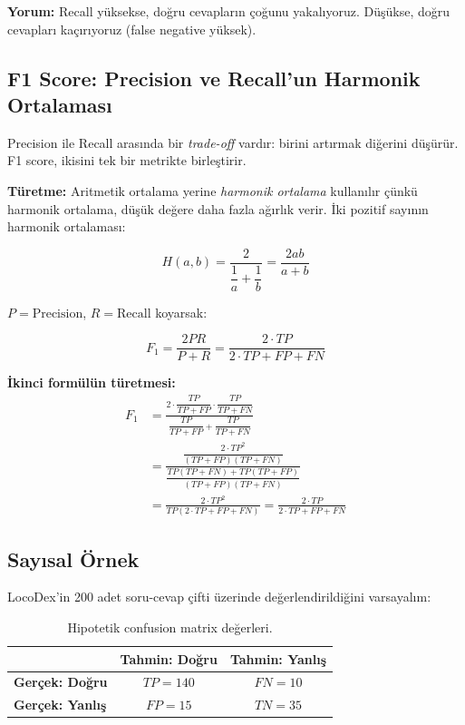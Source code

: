\textbf{Yorum:} Recall y\"{u}ksekse, do\u{g}ru cevaplar{\i}n \c{c}o\u{g}unu yakal{\i}yoruz. D\"{u}\c{s}\"{u}kse, do\u{g}ru cevaplar{\i} ka\c{c}{\i}r{\i}yoruz (false negative y\"{u}ksek).

\subsection{F1 Score: Precision ve Recall'un Harmonik Ortalamas{\i}}

Precision ile Recall aras{\i}nda bir \emph{trade-off} vard{\i}r: birini art{\i}rmak di\u{g}erini d\"{u}\c{s}\"{u}r\"{u}r. F1 score, ikisini tek bir metrikte birle\c{s}tirir.

\textbf{T\"{u}retme:} Aritmetik ortalama yerine \emph{harmonik ortalama} kullan{\i}l{\i}r \c{c}\"{u}nk\"{u} harmonik ortalama, d\"{u}\c{s}\"{u}k de\u{g}ere daha fazla a\u{g}{\i}rl{\i}k verir. \.{I}ki pozitif say{\i}n{\i}n harmonik ortalamas{\i}:

\begin{equation}
H(a, b) = \frac{2}{\dfrac{1}{a} + \dfrac{1}{b}} = \frac{2ab}{a + b}
\end{equation}

$P = \text{Precision}$, $R = \text{Recall}$ koyarsak:

\begin{equation}
\label{eq:f1}
\boxed{F_1 = \frac{2PR}{P + R} = \frac{2 \cdot TP}{2 \cdot TP + FP + FN}}
\end{equation}

\textbf{\.{I}kinci form\"{u}l\"{u}n t\"{u}retmesi:}
\begin{align}
F_1 &= \frac{2 \cdot \dfrac{TP}{TP+FP} \cdot \dfrac{TP}{TP+FN}}{\dfrac{TP}{TP+FP} + \dfrac{TP}{TP+FN}} \nonumber \\[6pt]
&= \frac{\dfrac{2 \cdot TP^2}{(TP+FP)(TP+FN)}}{\dfrac{TP(TP+FN) + TP(TP+FP)}{(TP+FP)(TP+FN)}} \nonumber \\[6pt]
&= \frac{2 \cdot TP^2}{TP(2 \cdot TP + FP + FN)} = \frac{2 \cdot TP}{2 \cdot TP + FP + FN}
\end{align}

\subsection{Say{\i}sal \"{O}rnek}

LocoDex'in 200 adet soru-cevap \c{c}ifti \"{u}zerinde de\u{g}erlendirildi\u{g}ini varsayal{\i}m:

\begin{table}[H]
\centering
\caption{Hipotetik confusion matrix de\u{g}erleri.}
\label{tab:confusion-values}
\begin{tabular}{lcc}
\toprule
& \textbf{Tahmin: Do\u{g}ru} & \textbf{Tahmin: Yanl{\i}\c{s}} \\
\midrule
\textbf{Ger\c{c}ek: Do\u{g}ru} & $TP = 140$ & $FN = 10$ \\
\textbf{Ger\c{c}ek: Yanl{\i}\c{s}} & $FP = 15$ & $TN = 35$ \\
\bottomrule
\end{tabular}
\end{table}


